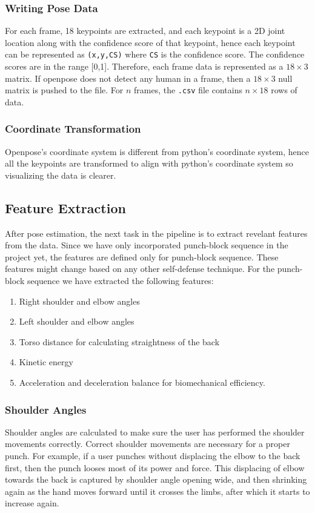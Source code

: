 \subsubsection{Writing Pose Data}

For each frame, 18 keypoints are extracted, and each keypoint is a 2D joint location along with the confidence score of that keypoint, hence each keypoint can be represented as \texttt{(x,y,CS)} where \texttt{CS} is the confidence score. The confidence scores are in the range [0,1]. Therefore, each frame data is represented as a $18 \times 3$ matrix. If openpose does not detect any human in a frame, then a $18 \times 3$ null matrix is pushed to the file. For $n$ frames, the \texttt{.csv} file contains $n \times 18$ rows of data. 

\subsubsection{Coordinate Transformation}
Openpose's coordinate system is different from python's coordinate system, hence all the keypoints are transformed to align with python's coordinate system so visualizing the data is clearer. 

\subsection{Feature Extraction}

After pose estimation, the next task in the pipeline is to extract revelant features from  the data. Since we have only incorporated punch-block sequence in the project yet, the features are defined only for punch-block sequence. These features might change based on any other self-defense technique. For the punch-block sequence \cite{karatePunch} we have extracted the following features:

\begin{enumerate}
  \item Right shoulder and elbow angles 
  \item Left shoulder and elbow angles 
  \item Torso distance for calculating straightness of the back
  \item Kinetic energy 
  \item Acceleration and deceleration balance for biomechanical efficiency. 
\end{enumerate}

\subsubsection{Shoulder Angles}
Shoulder angles are calculated to make sure the user has performed the shoulder movements correctly. Correct shoulder movements are necessary for a proper punch. For example, if a user punches without displacing the elbow to the back first, then the punch looses most of its power and force. This displacing of elbow towards the back is captured by shoulder angle opening wide, and then shrinking again as the hand moves forward until it crosses the limbs, after which it starts to increase again. 

